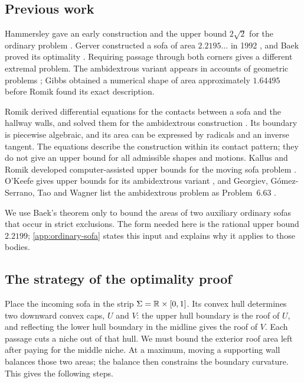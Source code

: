 \subsection{Previous work}

Hammersley gave an early construction and the upper bound $2\sqrt2$ for
the ordinary problem \cite{Hammersley68}. Gerver constructed a sofa of
area $2.2195\ldots$ in 1992 \cite{Gerver92}, and Baek proved its
optimality \cite{Baek}. Requiring passage through both corners gives
a different extremal problem. The ambidextrous variant appears in
accounts of geometric problems \cite{CroftFalconerGuy91,Stewart04};
Gibbs obtained a numerical shape of area approximately $1.64495$
\cite{Gibbs14} before Romik found its exact description.

Romik derived differential equations for the contacts between a sofa
and the hallway walls, and solved them for the ambidextrous construction
\cite[Theorem~5]{Romik18}. Its boundary is piecewise algebraic, and
its area can be expressed by radicals and an inverse tangent. The
equations describe the construction within its contact pattern; they
do not give an upper bound for all admissible shapes and motions.
Kallus and Romik developed computer-assisted upper bounds for the
moving sofa problem \cite{KallusRomik18}. O'Keefe gives upper bounds
for its ambidextrous variant \cite{OKeefe26}, and Georgiev,
G\'omez-Serrano, Tao and Wagner list the ambidextrous problem as
Problem~6.63 \cite{GGTW25}.

We use Baek's theorem only to bound the areas of two auxiliary
ordinary sofas that occur in strict exclusions. The form needed here
is the rational upper bound $2.2199$; \cref{app:ordinary-sofa}
states this input and explains why it applies to those bodies.

\subsection{The strategy of the optimality proof}\label{sec:strategy-optimality}

Place the incoming sofa in the strip
$\Sigma=\mathbb{R}\times[0,1]$. Its convex hull determines two downward
convex caps, $U$ and $V$: the upper hull boundary is the roof of $U$,
and reflecting the lower hull boundary in the midline gives the roof
of $V$. Each passage cuts a niche out of that hull. We must bound the
exterior roof area left after paying for the middle niche. At a
maximum, moving a supporting wall balances those two areas; the balance
then constrains the boundary curvature. This gives the following steps.

